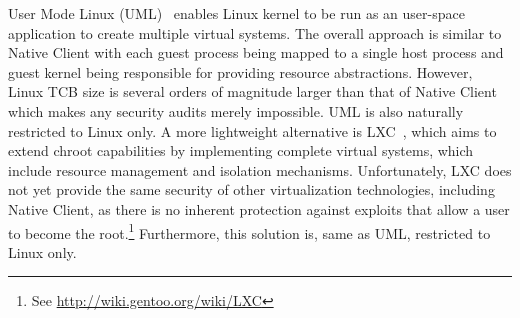User Mode Linux (UML)~\cite{dike:uml06} enables Linux kernel to be run as
an user-space application to create multiple virtual systems. The
overall approach is similar to Native Client with each guest process being
mapped to a single host process and guest kernel being responsible for
providing resource abstractions. However, Linux TCB size is several
orders of magnitude larger than that of Native Client which makes any
security audits merely impossible. UML is also naturally restricted to
Linux only. A more lightweight alternative is LXC~\cite{lxc}, which aims
to extend chroot capabilities by implementing complete virtual systems,
which include resource management and isolation mechanisms.
Unfortunately, LXC does not yet provide the same security of other
virtualization technologies, including Native Client, as there is no
inherent protection against exploits that allow a user to become the
root.\footnote{See \url{http://wiki.gentoo.org/wiki/LXC}} Furthermore,
this solution is, same as UML, restricted to Linux only. 


